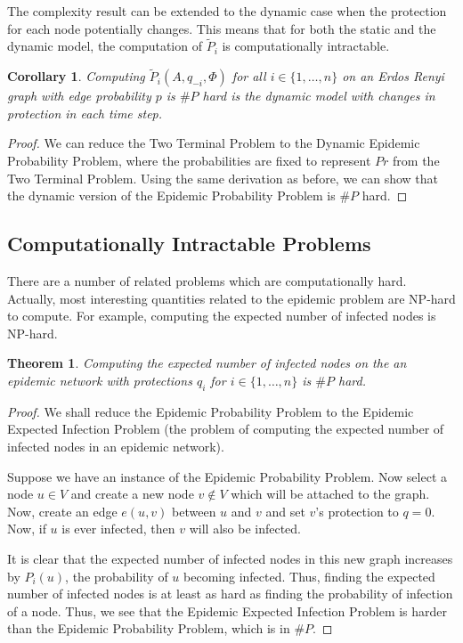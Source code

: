 \documentclass{article}
\theoremstyle{plain}
\newtheorem{theorem}{Theorem}
\newtheorem{corollary}{Corollary}
\begin{document}
The complexity result can be extended to the dynamic case when the protection for each node potentially changes. This means that for both the static and the dynamic model, the computation of $\tilde{P}_i$ is computationally intractable.

\begin{corollary}
  Computing $\tilde{P}_i(A, q_{-i}, \Phi)$ for all $i \in \{1, \ldots, n\}$ on an Erdos Renyi graph with edge probability $p$ is $\# P$ hard is the dynamic model with changes in protection in each time step.
\end{corollary}
\begin{proof}
  We can reduce the Two Terminal Problem to the Dynamic Epidemic Probability Problem, where the probabilities are fixed to represent $Pr$ from the Two Terminal Problem. Using the same derivation as before, we can show that the dynamic version of the Epidemic Probability Problem is $\# P$ hard.
\end{proof}

\subsection{Computationally Intractable Problems}

There are a number of related problems which are computationally hard. Actually, most interesting quantities related to the epidemic problem are NP-hard to compute. For example, computing the expected number of infected nodes is NP-hard.

\begin{theorem}
  Computing the expected number of infected nodes on the an epidemic network with protections $q_i$ for $i \in \{1, \ldots, n\}$ is $\# P$ hard.
\end{theorem}
\begin{proof}
  We shall reduce the Epidemic Probability Problem to the Epidemic Expected Infection Problem (the problem of computing the expected number of infected nodes in an epidemic network).

  Suppose we have an instance of the Epidemic Probability Problem. Now select a node $u \in V$ and create a new node $v \not \in V$ which will be attached to the graph. Now, create an edge $e(u,v)$ between $u$ and $v$ and set $v$'s protection to $q = 0$. Now, if $u$ is ever infected, then $v$ will also be infected.

  It is clear that the expected number of infected nodes in this new graph increases by $P_i(u)$, the probability of $u$ becoming infected. Thus, finding the expected number of infected nodes is at least as hard as finding the probability of infection of a node. Thus, we see that the Epidemic Expected Infection Problem is harder than the Epidemic Probability Problem, which is in $\# P$.
\end{proof}
\end{document}
